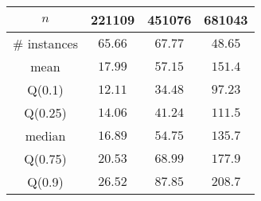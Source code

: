 \begin{tabular}{c|ccc} 
\hline 
$n$ & 221109 & 451076 & 681043 \tabularnewline 
\hline 
\hline 
\# instances & $65.66$ & $67.77$ & $48.65$ \tabularnewline 
mean & $17.99$ & $57.15$ & $151.4$ \tabularnewline 
Q(0.1) & $12.11$ & $34.48$ & $97.23$ \tabularnewline 
Q(0.25) & $14.06$ & $41.24$ & $111.5$ \tabularnewline 
median & $16.89$ & $54.75$ & $135.7$ \tabularnewline 
Q(0.75) & $20.53$ & $68.99$ & $177.9$ \tabularnewline 
Q(0.9) & $26.52$ & $87.85$ & $208.7$ \tabularnewline 
\hline 
\end{tabular} 
\medskip{} 

